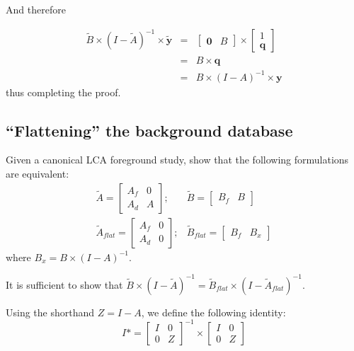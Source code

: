 And therefore

\begin{eqnarray}
  \tilde{B}\times(I-\tilde{A})^{-1}\times\tilde{\mathbf{y}} &=& \left[\begin{array}{cc}\mathbf{0}&B\end{array}\right]\times\left[\begin{array}{c}
      1\\
      \mathbf{q}
    \end{array}\right]\\
   &=&B\times\mathbf{q}\\
   &=&B\times(I-A)^{-1}\times\mathbf{y}
\end{eqnarray}
thus completing the proof.

\subsection{``Flattening'' the background database}

Given a canonical LCA foreground study, show that the following formulations are equivalent:
\begin{eqnarray}
\tilde{A} = \left[\begin{array}{cc}
A_f & 0 \\
A_d &  A
  \end{array}
\right];&
  \tilde{B} = \left[\begin{array}{cc} B_f & B   \end{array}\right] \\
 \tilde{A}_{flat} = \left[\begin{array}{cc} 
A_f &  0 \\
A_d & 0 
   \end{array}\right];&  \tilde{B}_{flat} = \left[\begin{array}{cc} B_f & B_x \end{array}\right ]
\end{eqnarray}
where $B_x = B\times(I-A)^{-1}$.

It is sufficient to show that $\tilde{B}\times(I-\tilde{A})^{-1} = \tilde{B}_{flat}\times(I-\tilde{A}_{flat})^{-1}$.

Using the shorthand $Z=I-A$, we define the following identity:
\begin{equation}
  I* = \left[\begin{array}{cc}
      I & 0 \\
      0 & Z
    \end{array}\right]^{-1} \times
  \left[\begin{array}{cc}
      I & 0 \\
      0 & Z
    \end{array}\right]
\end{equation}

